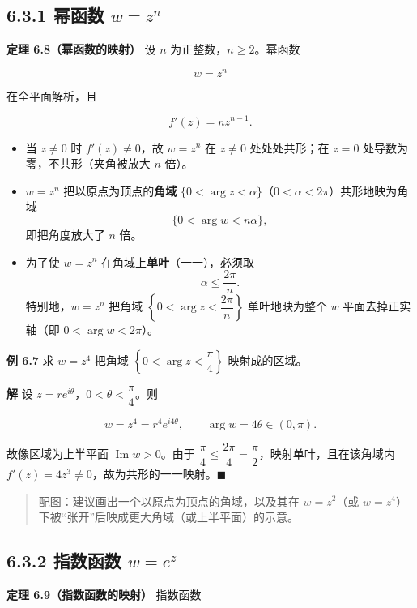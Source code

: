 \subsection{\texorpdfstring{6.3.1 幂函数
\(w=z^n\)}{6.3.1 幂函数 w=z\^{}n}}\label{ux5e42ux51fdux6570-wzn}

\textbf{定理 6.8（幂函数的映射）} 设 \(n\) 为正整数，\(n\ge 2\)。幂函数

\[
w=z^{n}
\]

在全平面解析，且

\[
f'(z)=n z^{n-1}.
\]

\begin{itemize}
\tightlist
\item
  当 \(z\neq 0\) 时 \(f'(z)\neq 0\)，故 \(w=z^n\) 在 \(z\neq 0\)
  处处处共形；在 \(z=0\) 处导数为零，不共形（夹角被放大 \(n\) 倍）。
\item
  \(w=z^n\) 把以原点为顶点的\textbf{角域}
  \(\{0<\arg z<\alpha\}\)（\(0<\alpha<2\pi\)）共形地映为角域 \[
  \{0<\arg w<n\alpha\},
  \] 即把角度放大了 \(n\) 倍。
\item
  为了使 \(w=z^n\) 在角域上\textbf{单叶}（一一），必须取 \[
  \alpha\le \frac{2\pi}{n}.
  \] 特别地，\(w=z^n\) 把角域
  \(\left\{0<\arg z<\dfrac{2\pi}{n}\right\}\) 单叶地映为整个 \(w\)
  平面去掉正实轴（即 \(0<\arg w<2\pi\)）。
\end{itemize}

\textbf{例 6.7} 求 \(w=z^4\) 把角域
\(\left\{0<\arg z<\dfrac{\pi}{4}\right\}\) 映射成的区域。

\textbf{解} 设 \(z=re^{i\theta}\)，\(0<\theta<\dfrac{\pi}{4}\)。则

\[
w=z^{4}=r^{4}e^{i4\theta},\qquad \arg w=4\theta\in(0,\pi).
\]

故像区域为上半平面 \(\operatorname{Im}w>0\)。由于
\(\dfrac{\pi}{4}\le\dfrac{2\pi}{4}=\dfrac{\pi}{2}\)，映射单叶，且在该角域内
\(f'(z)=4z^{3}\neq 0\)，故为共形的一一映射。\(\blacksquare\)

\begin{quote}
配图：建议画出一个以原点为顶点的角域，以及其在 \(w=z^2\)（或
\(w=z^4\)）下被``张开''后映成更大角域（或上半平面）的示意。
\end{quote}

\subsection{\texorpdfstring{6.3.2 指数函数
\(w=e^z\)}{6.3.2 指数函数 w=e\^{}z}}\label{ux6307ux6570ux51fdux6570-wez}

\textbf{定理 6.9（指数函数的映射）} 指数函数

